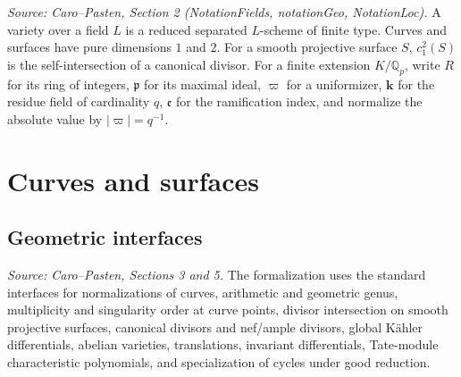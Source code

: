 \begin{definition}
  \label{def:cp_notation}
  \textit{Source: Caro--Pasten, Section 2 (NotationFields, notationGeo, NotationLoc).}
  A variety over a field \(L\) is a reduced separated \(L\)-scheme of finite
  type.  Curves and surfaces have pure dimensions \(1\) and \(2\).  For a smooth
  projective surface \(S\), \(c_1^2(S)\) is the self-intersection of a canonical
  divisor.  For a finite extension \(K/\mathbb Q_p\), write \(R\) for its ring
  of integers, \(\mathfrak p\) for its maximal ideal, \(\varpi\) for a
  uniformizer, \(\mathbf k\) for the residue field of cardinality \(q\),
  \(\mathfrak e\) for the ramification index, and normalize the absolute value
  by \(|\varpi|=q^{-1}\).
\end{definition}

\section{Curves and surfaces}

\subsection{Geometric interfaces}

\begin{definition}
  \label{def:cp_geometry_interfaces}
  \textit{Source: Caro--Pasten, Sections 3 and 5.}
  The formalization uses the standard interfaces for normalizations of curves,
  arithmetic and geometric genus, multiplicity and singularity order at curve
  points, divisor intersection on smooth projective surfaces, canonical divisors
  and nef/ample divisors, global Kähler differentials, abelian varieties,
  translations, invariant differentials, Tate-module characteristic
  polynomials, and specialization of cycles under good reduction.
\end{definition}

